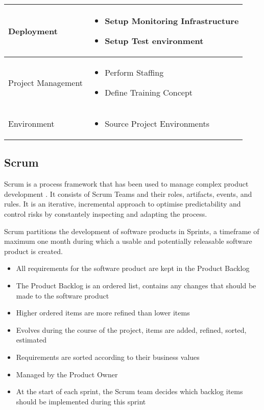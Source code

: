 \begin{tabularx}{\textwidth}{@{} l X @{}}
		\midrule
		Deployment & 
		\begin{itemize}
			\item Setup Monitoring Infrastructure
			\item Setup Test environment
		\end{itemize}
		\\
		\midrule
		Project Management & 
		\begin{itemize}
			\item Perform Staffing
			\item Define Training Concept
		\end{itemize}
		\\
		\midrule
		Environment & 
		\begin{itemize}
			\item Source Project Environments
		\end{itemize}
		\\
		\bottomrule
	\end{tabularx}
	
\subsection{Scrum}
Scrum is a process framework that has been used to manage complex product development \citep{Schwaber:2013aa}. It consists of Scrum Teams and their roles, artifacts, events, and rules. It is an iterative, incremental approach to optimise predictability and control risks by constantely inspecting and adapting the process.

Scrum partitions the development of software products in Sprints, a timeframe of maximum one month during which a usable and potentially releasable software product is created. 

\begin{itemize}
	\item All requirements for the software product are kept in the Product Backlog
	\item The Product Backlog is an ordered list, contains any changes that should be made to the software product
	\item Higher ordered items are more refined than lower items
	\item Evolves during the course of the project, items are added, refined, sorted, estimated
	\item Requirements are sorted according to their business values
	\item Managed by the Product Owner
	\item At the start of each sprint, the Scrum team decides which backlog items should be implemented during this sprint
\end{itemize}

